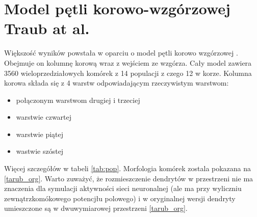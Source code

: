 \section{Model pętli korowo-wzgórzowej Traub at al.}
Większość wyników powstała w oparciu o model pętli korowo wzgórzowej \cite{Traub2005}. Obejmuje on kolumnę korową wraz z wejściem ze wzgórza. Cały model zawiera 3560 wieloprzedziałowych komórek z 14 populacji z czego 12 w korze. Kolumna korowa składa się z 4 warstw odpowiadającym rzeczywistym warstwom:
\begin{itemize}
\item połączonym warstwom drugiej i trzeciej
\item warstwie czwartej
\item warstwie piątej
\item wastwie szóstej
\end{itemize}
Więcej szczegółów w tabeli \ref{tab:pop}. Morfologia komórek zostala pokazana na \ref{tarub_org}. Warto zuważyć, że rozmieszczenie dendrytów w przestrzeni nie ma znaczenia dla symulacji aktywności sieci neuronalnej (ale ma przy wyliczniu zewnątrzkomókowego potencjłu polowego) i w oryginalnej wersji dendryty umieszczone są w dwuwymiarowej przestrzeni \ref{tarub_org}.

